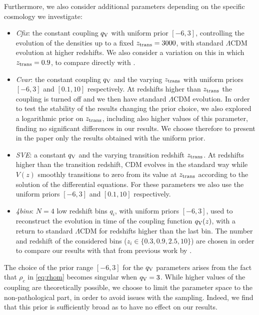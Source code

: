 \documentclass[a4paper,fleqn,usenatbib]{mnras}
\newcommand*{\qv}{$q_{\rm V}(z)$}
\begin{document}
Furthermore, we also consider additional parameters depending on the specific cosmology we investigate:
\begin{itemize}
\item {\it Cfix}: the constant coupling $q_{\rm V}$ with uniform prior $[-6,3]$, controlling the evolution of the densities up to a fixed $z_{\rm trans}=3000$, with standard $\Lambda$CDM evolution at higher redshifts. We also consider a variation on this in which $z_{\rm trans} = 0.9$, to compare directly with \cite{Salvatelli2014}.
\item {\it Cvar}: the constant coupling $q_{\rm V}$ and the varying $z_{\rm trans}$ with uniform priors $[-6,3]$ and $[0.1,10]$ respectively. At redshifts higher than $z_{\rm trans}$ the coupling is turned off and we then have standard $\Lambda$CDM evolution. In order to test the stability of the results changing the prior choice, we also explored a logarithmic prior on $z_{\rm trans}$, including also higher values of this parameter, finding no significant differences in our results. We choose therefore to present in the paper only the results obtained with the uniform prior.
\item \textit{SVE}: a constant $q_{\rm V}$ and the varying transition redshift $z_{\rm trans}$. At redshifts higher than the transition redshift, CDM evolves in the standard way while $V(z)$ smoothly transitions to zero from its value at $z_{\rm trans}$ according to the solution of the differential equations. For these parameters we also use the uniform priors $[-6,3]$ and $[0.1,10]$ respectively.
\item {\it 4bins}: $N=4$ low redshift bins $q_i$, with uniform priors $[-6,3]$, used to reconstruct the evolution in time of the coupling function \qv, with a return to standard $\Lambda$CDM for redshifts higher than the last bin. The number and redshift of the considered bins ($z_i \in \{0.3, 0.9, 2.5, 10\}$) are chosen in order to compare our results with that from previous work by \cite{Salvatelli2014}.
\end{itemize}

\noindent
The choice of the prior range $[-6,3]$ for the $q_{\rm V}$ parameters arises from the fact that $\rho_c$ in  \eqref{eq:rhom} becomes singular when $q_{\rm V}=3$. While higher values of the coupling are theoretically possible, we choose to limit the parameter space to the non-pathological part, in order to avoid issues with the sampling. Indeed, we find that this prior is sufficiently broad as to have no effect on our results.
\end{document}
